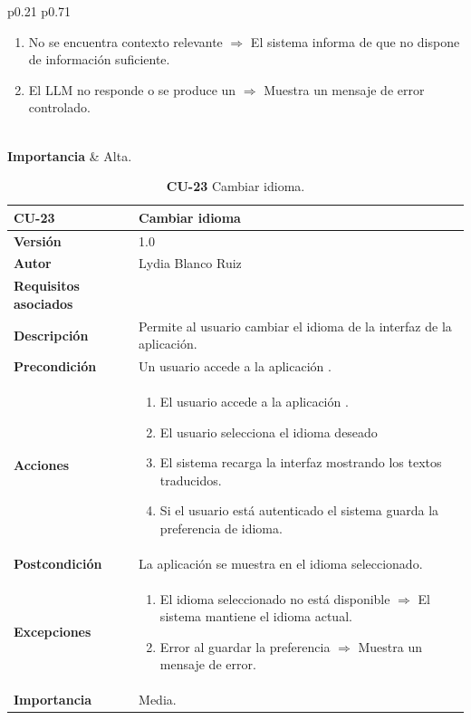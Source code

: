 \begin{table}[p]
\begin{tabularx}{\linewidth}{ p{0.21\columnwidth} p{0.71\columnwidth} }
\begin{enumerate}
			\item No se encuentra contexto relevante $\Rightarrow$ El sistema informa de que no dispone de información suficiente.
			\item El LLM no responde o se produce un  $\Rightarrow$ Muestra un mensaje de error controlado.
		\end{enumerate}\\
		\textbf{Importancia}          & Alta.  \\
		\bottomrule
	\end{tabularx}
	\caption{\textbf{CU-22} Realizar consulta guiada.}
	\label{req-22}
\end{table}

\begin{table}[p]
	\centering
	\begin{tabularx}{\linewidth}{ p{} p{} }
		\toprule
		\textbf{\textbf{CU-23}}    & \textbf{ Cambiar idioma}\\
		\toprule
		\textbf{Versión}              & 1.0    \\
		\textbf{Autor}                & Lydia Blanco Ruiz \\
		\textbf{Requisitos asociados} & {RNF-16} \\
		\textbf{Descripción}          & Permite al usuario cambiar el idioma de la interfaz de la aplicación. \\
		\textbf{Precondición}         & Un usuario accede a la aplicación \eng{web}. \\
		\textbf{Acciones}             &
		\begin{enumerate}
			\def\labelenumi{\arabic{enumi}.}
			\tightlist
			\item El usuario accede a la aplicación \eng{web}.
			\item El usuario selecciona el idioma deseado
			\item El sistema recarga la interfaz mostrando los textos traducidos.
			\item Si el usuario está autenticado el sistema guarda la preferencia de idioma.
		\end{enumerate}\\
		\textbf{Postcondición}        & La aplicación se muestra en el idioma seleccionado. \\
		\textbf{Excepciones}          & 
		\begin{enumerate}
			\def\labelenumi{\arabic{enumi}.}
			\tightlist
			\item El idioma seleccionado no está disponible $\Rightarrow$ El sistema mantiene el idioma actual.
			\item Error al guardar la preferencia $\Rightarrow$ Muestra un mensaje de error.
		\end{enumerate}\\
		\textbf{Importancia}          & Media.  \\
		\bottomrule
	\end{tabularx}
	\caption{\textbf{CU-23} Cambiar idioma.}
	\label{req-23}
\end{table}

